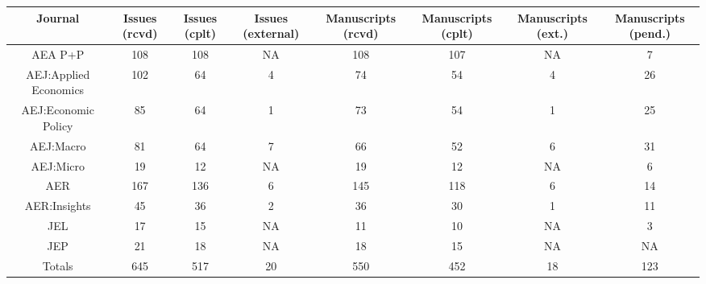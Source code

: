 
\begin{tabular}{@{\extracolsep{5pt}} cccccccc} 
\toprule 
Journal & Issues (rcvd) & Issues (cplt) & Issues (external) & Manuscripts (rcvd) & Manuscripts (cplt) & Manuscripts (ext.) & Manuscripts (pend.) \\ 
\midrule AEA P+P & 108 & 108 & NA & 108 & 107 & NA & 7 \\ 
AEJ:Applied Economics & 102 & 64 & 4 & 74 & 54 & 4 & 26 \\ 
AEJ:Economic Policy & 85 & 64 & 1 & 73 & 54 & 1 & 25 \\ 
AEJ:Macro & 81 & 64 & 7 & 66 & 52 & 6 & 31 \\ 
AEJ:Micro & 19 & 12 & NA & 19 & 12 & NA & 6 \\ 
AER & 167 & 136 & 6 & 145 & 118 & 6 & 14 \\ 
AER:Insights & 45 & 36 & 2 & 36 & 30 & 1 & 11 \\ 
JEL & 17 & 15 & NA & 11 & 10 & NA & 3 \\ 
JEP & 21 & 18 & NA & 18 & 15 & NA & NA \\ 
Totals & 645 & 517 & 20 & 550 & 452 & 18 & 123 \\ 
\bottomrule 
\end{tabular} 

